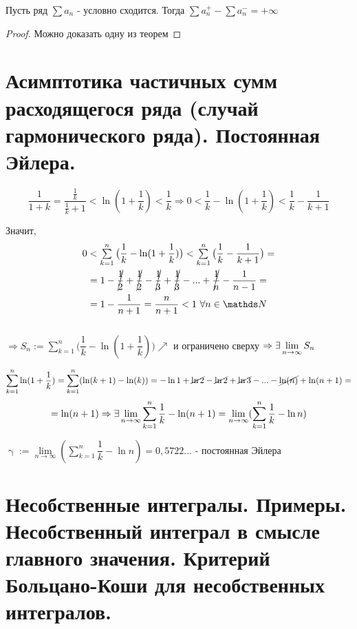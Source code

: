 \documentclass[12pt, fleqn]{article}
\begin{document}
\begin{Property}[3]
\begin{Property}[4]
\begin{Property}[2, аддитивность]
\begin{theorem} [Римана v2]
    Пусть ряд $\sum a_n$ - условно сходится. Тогда $\sum a_n^+ - \sum a_n^- = + \infty$
\end{theorem}

\begin{proof}
    Можно доказать одну из теорем
\end{proof}

\newpage
\section{Асимптотика частичных сумм расходящегося ряда (случай гармонического ряда). Постоянная Эйлера.}
 
\[\frac{1}{1+k} = \frac{\frac{1}{k}}{\frac{1}{k}+1} < \ln(1+\frac{1}{k}) < \frac{1}{k} \Rightarrow 0 < \frac{1}{k} - \ln(1+\frac{1}{k})< \frac{1}{k}-\frac{1}{k+1}\]

Значит, \begin{multline*}
    $$0 < \sum\limits_{k=1}^n \big(\dfrac{1}{k} - \ln(1+\dfrac{1}{k})\big) < \sum\limits_{k=1}^n \big(\dfrac{1}{k} - \dfrac{1}{k+1}\big) = \\
    =1 - \cancel{\frac{1}{2}} + \cancel{\frac{1}{2}} - \cancel{\frac{1}{3}} + \cancel{\frac{1}{3}} -...+ \cancel{\frac{1}{n}} - \frac{1}{n-1} =\\
    =1 - \frac{1}{n+1} = \frac{n}{n+1} < 1\ \forall n \in \N$$
\end{multline*}
\\
$\Rightarrow S_n := \sum\limits_{k=1}^n \big(\dfrac{1}{k} - \ln(1+\dfrac{1}{k})\big) \nearrow$ и ограничено сверху $\Rightarrow \exists \lim\limits_{n \rightarrow \infty} S_n$

$$\sum\limits_{k=1}^n \ln (1+ \frac{1}{k}) = \sum\limits_{k=1}^n (\ln(k+1) - \ln(k)) = -\ln1+\cancel{\ln2}-\cancel{\ln2}+\cancel{\ln3}-...-\cancel{\ln (n)}+ \ln (n+1) =$$
$$ =\ln (n+1) \Rightarrow \exists \lim\limits_{n \rightarrow \infty} \sum\limits_{k=1}^n \frac{1}{k} - \ln (n+1) = \lim\limits_{n \rightarrow \infty} (\sum\limits_{k=1}^n \frac{1}{k} - \ln n)$$

\begin{definition}
    $\upgamma := \lim\limits_{n \rightarrow \infty} (\sum\limits_{k=1}^n \dfrac{1}{k} - \ln n) = 0,5722...$ - постоянная Эйлера
\end{definition}

\newpage
\section{Несобственные интегралы. Примеры. Несобственный интеграл в смысле главного значения. Критерий Больцано-Коши для несобственных интегралов.}


\end{Property}
\end{Property}
\end{Property}
\end{document}
